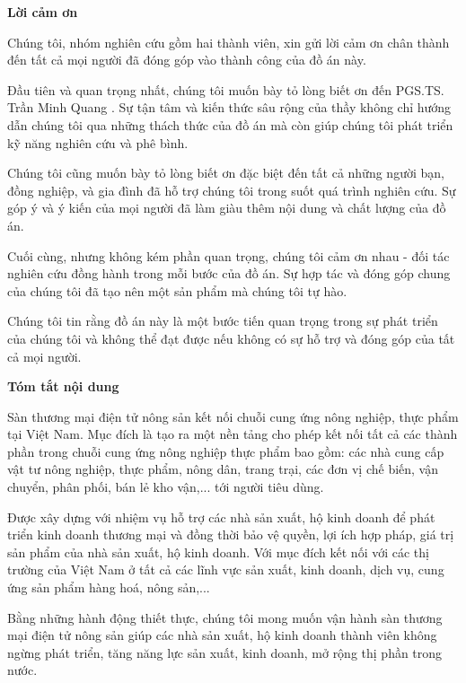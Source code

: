 \documentclass[12pt, a4paper]{report}
\theoremstyle{definition}
\newenvironment{acknowledgments}{
	\begin{center}
	  {\bfseries Lời cảm ơn}
	\end{center}
	\quotation
  }{}
\newenvironment{abstr}{
        \begin{center}
	{\bfseries Tóm tắt nội dung}
        \end{center}
        \quotation
    }{}
\newcommand{\Proc}{PGS.TS. Trần Minh Quang }
\begin{document}
\begin{acknowledgments}

Chúng tôi, nhóm nghiên cứu gồm hai thành viên, xin gửi lời cảm ơn chân thành đến tất cả mọi người đã đóng góp vào thành công của đồ án này.

Đầu tiên và quan trọng nhất, chúng tôi muốn bày tỏ lòng biết ơn đến \Proc. Sự tận tâm và kiến thức sâu rộng của thầy không chỉ hướng dẫn chúng tôi qua những thách thức của đồ án mà còn giúp chúng tôi phát triển kỹ năng nghiên cứu và phê bình.

Chúng tôi cũng muốn bày tỏ lòng biết ơn đặc biệt đến tất cả những người bạn, đồng nghiệp, và gia đình đã hỗ trợ chúng tôi trong suốt quá trình nghiên cứu. Sự góp ý và ý kiến của mọi người đã làm giàu thêm nội dung và chất lượng của đồ án.

Cuối cùng, nhưng không kém phần quan trọng, chúng tôi cảm ơn nhau - đối tác nghiên cứu đồng hành trong mỗi bước của đồ án. Sự hợp tác và đóng góp chung của chúng tôi đã tạo nên một sản phẩm mà chúng tôi tự hào.

Chúng tôi tin rằng đồ án này là một bước tiến quan trọng trong sự phát triển của chúng tôi và không thể đạt được nếu không có sự hỗ trợ và đóng góp của tất cả mọi người.

\end{acknowledgments}
\newpage
\begin{abstr}
Sàn thương mại điện tử nông sản kết nối chuỗi cung ứng nông nghiệp, thực phẩm tại Việt Nam. Mục đích là tạo ra một nền tảng cho phép kết nối tất cả các thành phần trong chuỗi cung ứng nông nghiệp thực phẩm bao gồm: các nhà cung cấp vật tư nông nghiệp, thực phẩm, nông dân, trang trại, các đơn vị chế biến, vận chuyển, phân phối, bán lẻ kho vận,... tới người tiêu dùng. 

Được xây dựng với nhiệm vụ hỗ trợ các nhà sản xuất, hộ kinh doanh để phát triển kinh doanh thương mại và đồng thời bảo vệ quyền, lợi ích hợp pháp, giá trị sản phẩm của nhà sản xuất, hộ kinh doanh. Với mục đích kết nối với các thị trường của Việt Nam ở tất cả các lĩnh vực sản xuất, kinh doanh, dịch vụ, cung ứng sản phẩm hàng hoá, nông sản,... 

Bằng những hành động thiết thực, chúng tôi mong muốn vận hành sàn thương mại điện tử nông sản giúp các nhà sản xuất, hộ kinh doanh thành viên không ngừng phát triển, tăng năng lực sản xuất, kinh doanh, mở rộng thị phần trong nước.

\end{abstr}	
\newpage
\tableofcontents
\newpage
\end{document}
